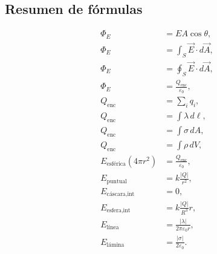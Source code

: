 \subsection{Resumen de fórmulas}

\begin{align*}
\Phi_E &= EA\cos\theta,\\
\Phi_E &= \int_S\vec E\cdot d\vec A,\\
\Phi_E &= \oint_S\vec E\cdot d\vec A,\\
\Phi_E &= \frac{Q_{\text{enc}}}{\varepsilon_0},\\
Q_{\text{enc}} &= \sum_iq_i,\\
Q_{\text{enc}} &= \int\lambda\,d\ell,\\
Q_{\text{enc}} &= \int\sigma\,dA,\\
Q_{\text{enc}} &= \int\rho\,dV,\\
E_{\text{esférica}}(4\pi r^2) &= \frac{Q_{\text{enc}}}{\varepsilon_0},\\
E_{\text{puntual}} &= k\frac{|Q|}{r^2},\\
E_{\text{cáscara,int}} &= 0,\\
E_{\text{esfera,int}} &= k\frac{|Q|}{R^3}r,\\
E_{\text{línea}} &= \frac{|\lambda|}{2\pi\varepsilon_0r},\\
E_{\text{lámina}} &= \frac{|\sigma|}{2\varepsilon_0}.
\end{align*}